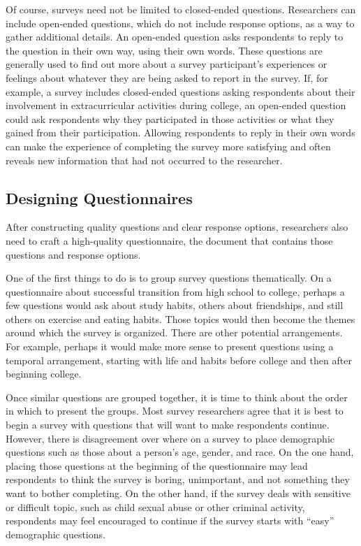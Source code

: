 Of course, surveys need not be limited to closed-ended questions. Researchers can include open-ended questions, which do not include response options, as a way to gather additional details. An open-ended question asks respondents to reply to the question in their own way, using their own words. These questions are generally used to find out more about a survey participant's experiences or feelings about whatever they are being asked to report in the survey. If, for example, a survey includes closed-ended questions asking respondents about their involvement in extracurricular activities during college, an open-ended question could ask respondents why they participated in those activities or what they gained from their participation. Allowing respondents to reply in their own words can make the experience of completing the survey more satisfying and often reveals new information that had not occurred to the researcher.

\subsection{Designing Questionnaires}

After constructing quality questions and clear response options, researchers also need to craft a high-quality questionnaire, the document that contains those questions and response options.

One of the first things to do is to group survey questions thematically. On a questionnaire about successful transition from high school to college, perhaps a few questions would ask about study habits, others about friendships, and still others on exercise and eating habits. Those topics would then become the themes around which the survey is organized. There are other potential arrangements. For example, perhaps it would make more sense to present questions using a temporal arrangement, starting with life and habits before college and then after beginning college.

Once similar questions are grouped together, it is time to think about the order in which to present the groups. Most survey researchers agree that it is best to begin a survey with questions that will want to make respondents continue\cite{dillman2011mail}. However, there is disagreement over where on a survey to place demographic questions such as those about a person's age, gender, and race. On the one hand, placing those questions at the beginning of the questionnaire may lead respondents to think the survey is boring, unimportant, and not something they want to bother completing. On the other hand, if the survey deals with sensitive or difficult topic, such as child sexual abuse or other criminal activity, respondents may feel encouraged to continue if the survey starts with ``easy'' demographic questions.

